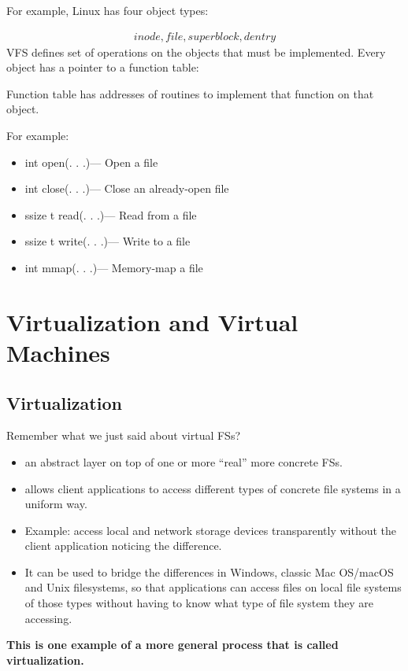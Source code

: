 For example, Linux has four object types:

\begin{align*}
    inode, file, superblock, dentry
\end{align*}
VFS defines set of operations on the objects that must be implemented. Every object has a pointer to a function table:

Function table has addresses of routines to implement that function on that object.

For example:
\begin{itemize}
    \item int open(. . .)— Open a file
    \item int close(. . .)— Close an already-open file
    \item ssize t read(. . .)— Read from a file
    \item ssize t write(. . .)— Write to a file
    \item int mmap(. . .)— Memory-map a file
\end{itemize}

\chapter{Virtualization and Virtual Machines}

\section{Virtualization}
Remember what we just said about virtual FSs?

\begin{itemize}
    \item an abstract layer on top of one or more “real” more concrete FSs.
    \item allows client applications to access different types of concrete file systems in a uniform way.
    \item Example: access local and network storage devices transparently without the client application noticing the difference.
    \item It can be used to bridge the differences in Windows, classic Mac OS/macOS and Unix filesystems, so that applications can access files on local file systems of those types without having to know what type of file system they are accessing.
\end{itemize}


\textbf{This is one example of a more general process that is called virtualization.}

